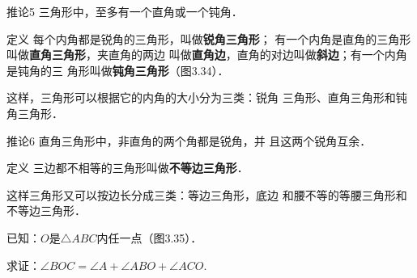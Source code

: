 \begin{blk}
    {推论5 }三角形中，至多有一个直角或一个钝角．
\end{blk}

\begin{blk}
   {定义} 每个内角都是锐角的三角形，叫做\textbf{锐角三角形}；
有一个内角是直角的三角形叫做\textbf{直角三角形}，夹直角的两边
叫做\textbf{直角边}，直角的对边叫做\textbf{斜边}；有一个内角是钝角的三
角形叫做\textbf{钝角三角形}（图3.34）．
\end{blk}

\begin{figure}[htp]
    \centering
{}
    \caption{}
\end{figure}

这样，三角形可以根据它的内角的大小分为三类：锐角
三角形、直角三角形和钝角三角形．

\begin{blk}
{推论6} 直角三角形中，非直角的两个角都是锐角，并
且这两个锐角互余．
\end{blk}

\begin{blk}
{定义}
三边都不相等的三角形叫做\textbf{不等边三角形}．
\end{blk}

这样三角形又可以按边长分成三类：等边三角形，底边
和腰不等的等腰三角形和不等边三角形．


\begin{example}
    已知：$O$是$\triangle ABC$内任一点（图3.35）．

求证：$\angle BOC=\angle A+\angle ABO+\angle ACO$.
\end{example}

